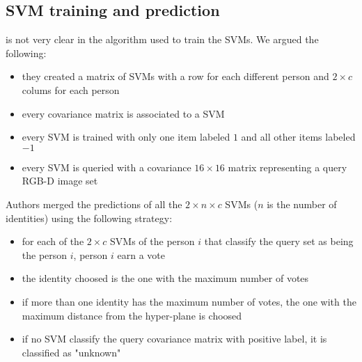 \documentclass{article}
\begin{document}
\subsection{SVM training and prediction}
\label{sec:training}
\cite{Hayat2016} is not very clear in the algorithm used to train
the SVMs. We argued the following:
\begin{itemize}
	\item they created a matrix of SVMs with a row for each different person
		and $2\times c$ colums for each person
	\item every covariance matrix is associated to a SVM
	\item every SVM is trained with only one item labeled $1$ and all other
		items labeled $-1$
	\item every SVM is queried with a covariance $16\times 16$ matrix representing
		a query RGB-D image set
\end{itemize}
Authors merged the predictions of all the $2\times n \times c$ SVMs ($n$ is the number of
identities) using the following strategy:
\begin{itemize}
	\item for each of the $2\times c$ SVMs of the person $i$ that classify the
		query set as being the person $i$, person $i$ earn a vote
	\item the identity choosed is the one with the maximum number of votes
	\item if more than one identity has the maximum number of votes, the
		one with the maximum distance from the hyper-plane is choosed
	\item if no SVM classify the query covariance matrix with positive label,
		it is classified as "unknown"
\end{itemize}
\end{document}
